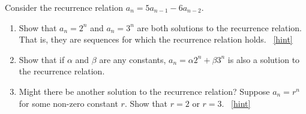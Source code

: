 \documentclass{book}
\begin{document}
\setcounter{project}{148}
\addtocounter{project}{-1}
\begin{activity}[]\label{activity-141}
\hypertarget{p-998}{}%
Consider the recurrence relation \(a_n = 5a_{n-1} - 6a_{n-2}\).%
\begin{enumerate}[font=\bfseries,label=(\alph*),ref=\alph*]
\item\label{task-183} \hypertarget{p-999}{}%
Show that \(a_n = 2^n\) and \(a_n = 3^n\) are both solutions to the recurrence relation.  That is, they are sequences for which the recurrence relation holds.%
~\hfill{\tiny\hyperlink{a-148.a}{[hint]}\hypertarget{q-148.a}{}}\item\label{task-184} \hypertarget{p-1001}{}%
Show that if \(\alpha\) and \(\beta\) are any constants, \(a_n = \alpha 2^n + \beta 3^n\) is also a solution to the recurrence relation.%
\item\label{task-185} \hypertarget{p-1002}{}%
Might there be another solution to the recurrence relation?  Suppose \(a_n = r^n\) for some non-zero constant \(r\).  Show that \(r = 2\) or \(r = 3\).%
~\hfill{\tiny\hyperlink{a-148.c}{[hint]}\hypertarget{q-148.c}{}}\end{enumerate}
\end{activity}
\end{document}
